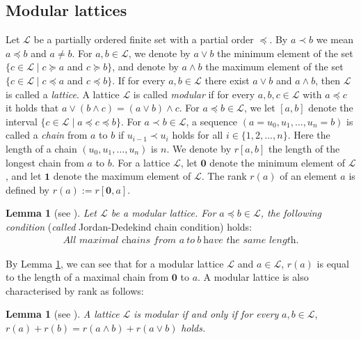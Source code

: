 \documentclass[11pt]{article}
\theoremstyle{definition}
\newtheorem{lemma}[theorem]{Lemma}
\begin{document}
\subsection{Modular lattices}
Let $\mathcal{L}$ be a partially ordered finite set with a partial order $\preceq$. By $a\prec b$ we mean $a\preceq b$ and $a\neq b$. For $a,b\in \mathcal{L}$, we denote by $a\vee b$ the minimum element of the set $\{c\in \mathcal{L}\mid c\succeq a$ and $c\succeq b\}$, and denote by $a\wedge b$ the maximum element of the set $\{c\in \mathcal{L}\mid c\preceq a$ and $c\preceq b\}$. If for every $a,b\in \mathcal{L}$ there exist $a\vee b$ and $a\wedge b$, then $\mathcal{L}$ is called a \textit{lattice}. A lattice $\mathcal{L}$ is called \textit{modular} if for every $a,b,c\in \mathcal{L}$ with $a\preceq c$ it holds that $a\vee (b\wedge c)=(a\vee b)\wedge c$. For $a\preceq b\in \mathcal{L}$, we let $[a,b]$ denote the interval $\{c\in \mathcal{L}\mid a\preceq c \preceq b\}$. For $a\prec b\in \mathcal{L}$, a sequence $(a=u_0,u_1,\ldots,u_n=b)$ is called a \textit{chain} from $a$ to $b$ if $u_{i-1}\prec u_i$ holds for all $i\in \{1,2,\ldots,n\}$. Here the length of a chain $(u_0,u_1,\ldots,u_n)$ is $n$. We denote by $r[a,b]$ the length of the longest chain from $a$ to $b$. For a lattice $\mathcal{L}$, let $\textbf{0}$ denote the minimum element of $\mathcal{L}$, and let $\textbf{1}$ denote the maximum element of $\mathcal{L}$. The rank $r(a)$ of an element $a$ is defined by $r(a):=r[\textbf{0},a]$.
\begin{lemma}[see {\cite[Chapter I\hspace{-.1em}I]{birkhoff1967}}]
\label{jordandedekind}
\textit{Let $\mathcal{L}$ be a modular lattice. For $a\preceq b\in \mathcal{L}$, the following condition }(\textit{called} Jordan-Dedekind chain condition) holds:
\begin{align}
    \mathrm{\textit{All\ maximal\ chains\ from\ }}a \ \mathrm{\textit{to}}\ b\ \mathrm{\textit{have\ the\ same\ length.}}
\end{align}
\end{lemma}
By Lemma \ref{jordandedekind}, we can see that for a modular lattice $\mathcal{L}$ and $a\in \mathcal{L}$, $r(a)$ is equal to the length of a maximal chain from $\textbf{0}$ to $a$. A modular lattice is also characterised by rank as follows:
\begin{lemma}[see {\cite[Chapter I\hspace{-.1em}I]{birkhoff1967}}]
\textit{A lattice }$\mathcal{L}$ \textit{is modular if and only if for every} $a,b\in \mathcal{L}$, $r(a)+r(b)=r(a\wedge b)+r(a\vee b)$ \textit{holds.}
\end{lemma}
\end{document}
